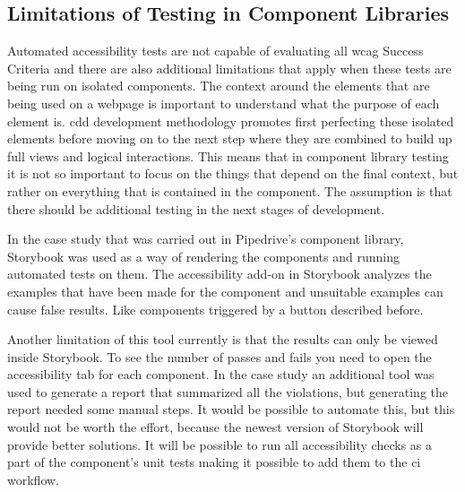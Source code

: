 \documentclass{master_thesis}
\begin{document}
\subsection{Limitations of Testing in Component Libraries}

Automated accessibility tests are not capable of evaluating all \ac{wcag} Success Criteria and there are also additional limitations that apply when these tests are being run on isolated components. The context around the elements that are being used on a webpage is important to understand what the purpose of each element is. \ac{cdd} development methodology promotes first perfecting these isolated elements before moving on to the next step where they are combined to build up full views and logical interactions. This means that in component library testing it is not so important to focus on the things that depend on the final context, but rather on everything that is contained in the component. The assumption is that there should be additional testing in the next stages of development.

In the case study that was carried out in Pipedrive's component library, Storybook was used as a way of rendering the components and running automated tests on them. The accessibility add-on in Storybook analyzes the examples that have been made for the component and unsuitable examples can cause false results. Like components triggered by a button described before.

Another limitation of this tool currently is that the results can only be viewed inside Storybook. To see the number of passes and fails you need to open the accessibility tab for each component. In the case study an additional tool was used to generate a report that summarized all the violations, but generating the report needed some manual steps. It would be possible to automate this, but this would not be worth the effort, because the newest version of Storybook will provide better solutions. It will be possible to run all accessibility checks as a part of the component's unit tests making it possible to add them to the \ac{ci} workflow.
\end{document}
